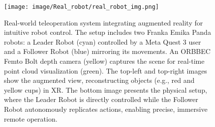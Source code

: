 \begin{figure}[h!]
    \centering
    \texttt{[image: image/Real\_robot/real\_robot\_img.png]}
    \caption{Real-world teleoperation system integrating augmented reality for intuitive robot control. The setup includes two Franka Emika Panda robots: a Leader Robot (cyan) controlled by a Meta Quest 3 user and a Follower Robot (blue) mirroring its movements. An ORBBEC Femto Bolt depth camera (yellow) captures the scene for real-time point cloud visualization (green). The top-left and top-right images show the augmented view, reconstructing objects (e.g., red and yellow cups) in XR. The bottom image presents the physical setup, where the Leader Robot is directly controlled while the Follower Robot autonomously replicates actions, enabling precise, immersive remote operation.}
    \label{fig:real_robot_point_cloud_setup}
\end{figure}
